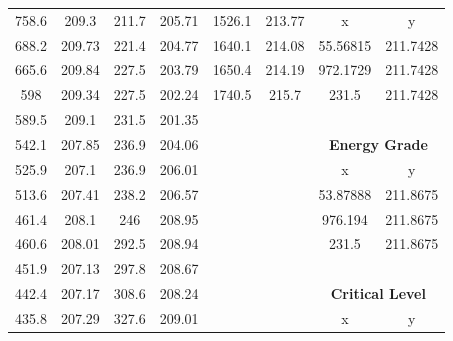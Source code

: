 \begin{center}
\begin{tabular}{|cccc||cc||cc|}
    \cline{7-8}
    758.6    & 209.3                    & 211.7 & 205.71                        & 1526.1 & 213.77                       & x        & y                                   \\
    688.2    & 209.73                   & 221.4 & 204.77                        & 1640.1 & 214.08                       & 55.56815 & 211.7428                            \\
    665.6    & 209.84                   & 227.5 & 203.79                        & 1650.4 & 214.19                       & 972.1729 & 211.7428                            \\
    598      & 209.34                   & 227.5 & 202.24                        & 1740.5 & 215.7                        & 231.5    & 211.7428                            \\
    589.5    & 209.1                    & 231.5 & 201.35                        &        &                              &          &                                     \\
    542.1    & 207.85                   & 236.9 & 204.06                        &        &                              & \multicolumn{2}{c|}{\textbf{Energy Grade }}    \\ 
    \cline{7-8}
    525.9    & 207.1                    & 236.9 & 206.01                        &        &                              & x        & y                                   \\
    513.6    & 207.41                   & 238.2 & 206.57                        &        &                              & 53.87888 & 211.8675                            \\
    461.4    & 208.1                    & 246   & 208.95                        &        &                              & 976.194  & 211.8675                            \\
    460.6    & 208.01                   & 292.5 & 208.94                        &        &                              & 231.5    & 211.8675                            \\
    451.9    & 207.13                   & 297.8 & 208.67                        &        &                              &          &                                     \\
    442.4    & 207.17                   & 308.6 & 208.24                        &        &                              & \multicolumn{2}{c|}{\textbf{Critical Level }}  \\ 
    \cline{7-8}
    435.8    & 207.29                   & 327.6 & 209.01                        &        &                              & x        & y                                   \\

\end{tabular}
\end{center}
